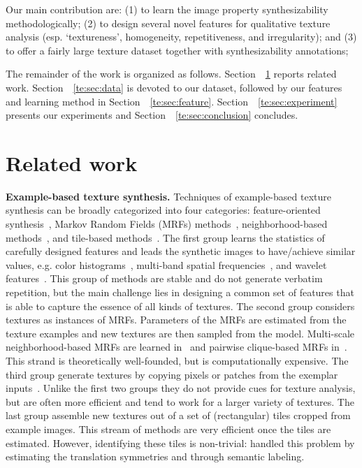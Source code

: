 Our main contribution are: (1) to learn the image property
synthesizability methodologically; (2) to design several novel
features for qualitative texture analysis (esp. `textureness',
homogeneity, repetitiveness, and irregularity); and (3) to offer a fairly
large texture dataset together with synthesizability annotations;


The remainder of the work is organized as follows.
Section~~\ref{te:sec:related} reports related work.
Section~~\ref{te:sec:data} is devoted to our dataset, followed by our features and learning method in Section~~\ref{te:sec:feature}.
Section~~\ref{te:sec:experiment} presents our experiments and Section~~\ref{te:sec:conclusion} concludes. 


\section{Related work}
\label{te:sec:related}

\textbf{Example-based texture synthesis.}  Techniques of example-based
texture synthesis can be broadly categorized into four categories:
feature-oriented synthesis~\citep{Heeger:95, Debonet:97,
  Portilla:2000:IJCV, random:phase}, Markov Random Fields (MRFs)
methods~\citep{paget:tip98, zhu:frame, Zalesny05}, neighborhood-based
methods~\citep{Efros:sig2001, Kwatra:2003, Kwatra:tog:2005,
  dai:facade:iccv13}, and tile-based methods~\citep{Cohen:2003:wang,
  Liu:2004:NTA}.  The first group learns the statistics of carefully
designed features and leads the synthetic images to have/achieve
similar values, e.g. color histograms~\citep{Heeger:95}, multi-band
spatial frequencies~\citep{Debonet:97}, and wavelet
features~\citep{Portilla:2000:IJCV}. This group of methods are stable
and do not generate verbatim repetition, but the main challenge lies
in designing a common set of features that is able to capture the
essence of all kinds of textures.  The second group considers textures
as instances of MRFs. Parameters of the MRFs are estimated from the
texture examples and new textures are then sampled from the
model. Multi-scale neighborhood-based MRFs are learned
in~\citep{paget:tip98} and pairwise clique-based MRFs
in~\citep{Zalesny05}. This strand is theoretically well-founded, but is
computationally expensive. The third group generate textures by
copying pixels or patches from the exemplar inputs~\citep{Efros:1999,
  Efros:sig2001, Kwatra:2003, Kwatra:tog:2005,
  dai:facade:iccv13}. Unlike the first two groups they do not provide
cues for texture analysis, but are often more efficient and tend to
work for a larger variety of textures. The last group assemble new
textures out of a set of (rectangular) tiles cropped from example
images. This stream of methods are very efficient once the tiles are
estimated. However, identifying these tiles is non-trivial:
\citep{liu:ijcv:05} handled this problem by estimating the translation
symmetries and \citep{dai:facade:iccv13} through semantic labeling.

